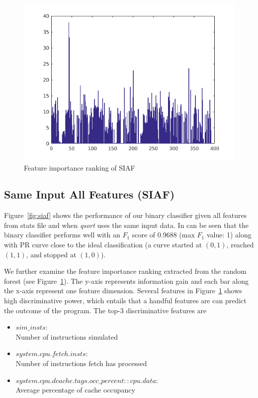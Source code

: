 \begin{figure}[t]
\begin{center}
   \includegraphics[width=0.8\linewidth]{./figures/feat_same.png}
\end{center}
\vspace{-0.5cm}
   \caption{Feature importance ranking of SIAF}
   \vspace{-0.3cm}
\label{fig:feat-same}
\end{figure}

\subsection{Same Input All Features (SIAF)}
Figure~\ref{fig:siaf} shows the performance of our binary classifier given all features from stats file and  when \emph{qsort} uses the same input data. In can be seen that the binary classifier performs well with an $F_1$ score of 0.9688 (max $F_1$ value: 1) along with PR curve close to the ideal classification (a curve started at $(0,1)$, reached $(1,1)$, and stopped at $(1,0)$). 

We further examine the feature importance ranking extracted from the random forest (see Figure~\ref{fig:feat-same}). The y-axis represents information gain and each bar along the x-axis represent one feature dimension. Several features in Figure~\ref{fig:feat-same} shows high discriminative power, which entails that a handful features are can predict the outcome of the program. The top-3 discriminative features are 
\begin{itemize}
\item $sim\_insts$: \\
Number of instructions simulated
\item $system.cpu.fetch.insts$: \\
Number of instructions fetch has processed
\item $system.cpu.dcache.tags.occ\_percent::cpu.data$: \\
Average percentage of cache occupancy
\end{itemize}

